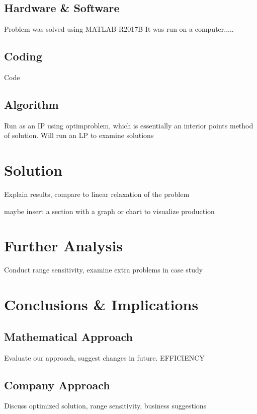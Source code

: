 \documentclass{article}
\begin{document}
\subsection{Hardware \& Software}
Problem was solved using MATLAB R2017B  It was run on a computer.....
\subsection{Coding}
Code
\subsection{Algorithm}
Run as an IP using optimproblem, which is essentially an interior points method of solution.  Will run an LP to examine solutions
\section{Solution}
Explain results, compare to linear relaxation of the problem
\par
maybe insert a section with a graph or chart to visualize production
\section{Further Analysis}
Conduct range sensitivity, examine extra problems in case study
\section{Conclusions \& Implications}
\subsection{Mathematical Approach}
Evaluate our approach, suggest changes in future.  EFFICIENCY
\subsection{Company Approach}
Discuss optimized solution, range sensitivity, business suggestions
	\newpage
	\begin{thebibliography}{9}

\end{thebibliography}
\end{document}
